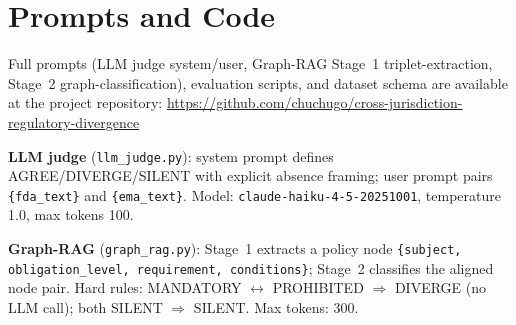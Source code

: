 \documentclass[manuscript]{acmart}
\begin{document}
\appendix

\section{Prompts and Code}
\label{app:prompt}

Full prompts (LLM judge system/user, Graph-RAG Stage~1 triplet-extraction,
Stage~2 graph-classification), evaluation scripts, and dataset schema are
available at the project repository:
\url{https://github.com/chuchugo/cross-jurisdiction-regulatory-divergence}

\noindent\textbf{LLM judge} (\texttt{llm\_judge.py}): system prompt defines
AGREE/DIVERGE/SILENT with explicit absence framing; user prompt pairs
\texttt{\{fda\_text\}} and \texttt{\{ema\_text\}}.
Model: \texttt{claude-haiku-4-5-20251001}, temperature 1.0, max tokens 100.

\noindent\textbf{Graph-RAG} (\texttt{graph\_rag.py}): Stage~1 extracts a
policy node \texttt{\{subject, obligation\_level, requirement, conditions\}};
Stage~2 classifies the aligned node pair. Hard rules: MANDATORY
$\leftrightarrow$ PROHIBITED $\Rightarrow$ DIVERGE (no LLM call); both
SILENT $\Rightarrow$ SILENT. Max tokens: 300.
\end{document}
